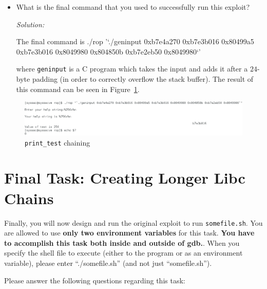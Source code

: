 \documentclass[a4paper,11pt]{article}
\newenvironment{solution}%
{\par{\noindent\small\textit{Solution:}}\vspace{-12pt}\begin{framed}}%
{\end{framed}\par}
\begin{document}
\begin{itemize}
\begin{solution}
\end{solution}\fi
\item What is the final command that you used to successfully run this exploit?
\ifsolution\begin{solution}
The final command is
\textsf{./rop '`./geninput 0xb7e4a270 0xb7e3b016 0x80499a5 0xb7e3b016 0x8049980 0x804850b 0xb7e2eb50 0x8049980`'}

where \texttt{geninput} is a C program which takes the input and adds it after a $24$-byte padding (in order
to correctly overflow the stack buffer). The result of this command can be seen in Figure~\ref{fig:printtest}.

\end{solution}\fi
\end{itemize}

\begin{figure}[H] \center
  \includegraphics[width=1\linewidth]{pics/print_test.png}
  \caption{\texttt{print\_test} chaining}
  \label{fig:printtest}
\end{figure}

\section*{Final Task: Creating Longer Libc Chains}
Finally, you will now design and run the original exploit to run
\texttt{somefile.sh}. You are allowed to use \textbf{only two environment
  variables} for this task. \textbf{You have to accomplish this task both inside
  and outside of gdb.}.  When you specify the shell file to execute (either to
the program or as an environment variable), please enter ``./somefile.sh'' (and
not just ``somefile.sh''). 

\noindent Please answer the following questions regarding this task:
\end{document}
